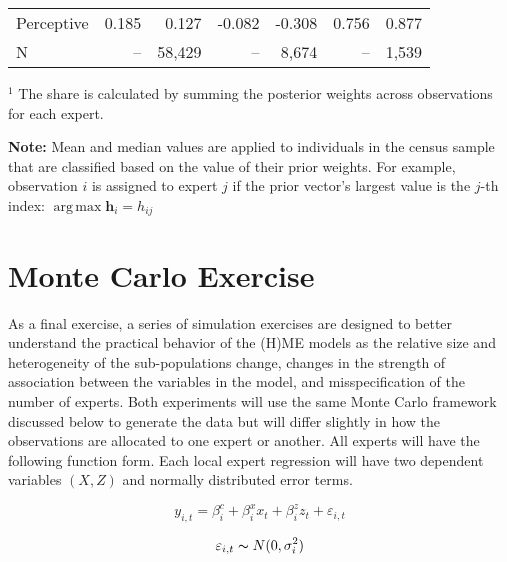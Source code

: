 \documentclass[12pt]{article}
\DeclareMathOperator*{\argmax}{arg\,max}
\theoremstyle{definition}
\begin{document}
\begin{table}
\begin{threeparttable}
\begin{tabular}[l]{l r r r r r r}
      Perceptive            &   0.185 &   0.127 & -0.082 & -0.308 &   0.756 &   0.877 \\
      \cmidrule{1-7}
      N                     &      -- &  58,429 &     -- &  8,674 &      -- &   1,539 \\
      \hline
        \end{tabular}
        \begin{tablenotes}
          \item{\footnotesize $^{1}$ The share is calculated by summing the 
          posterior weights across observations for each expert.}
          \item{\footnotesize \textbf{Note:} Mean and median values are applied to individuals
          in the census sample that are classified based on the value of their prior weights.
          For example, observation $i$ is assigned to expert $j$ if the prior vector's
          largest value is the $j$-th index: $\argmax \boldsymbol{h}_{i} = h_{ij}$}
        \end{tablenotes} \label{tbl:HME3_sample_comparison}
      \end{threeparttable}
    \end{table}
  

\clearpage


\section{Monte Carlo Exercise} \label{sec:MonteCarlo}

As a final exercise, a series of simulation exercises are designed to better understand the practical behavior of the (H)ME models as the relative size and heterogeneity of the sub-populations change, changes in the strength of association between the variables in the model, and misspecification of the number of experts. Both experiments will use the same Monte Carlo framework discussed below to generate the data but will differ slightly in how the observations are allocated to one expert or another. All experts will have the following function form. Each local expert regression will have two dependent variables $(X, Z)$ and normally distributed error terms. 

\begin{equation} \label{eq:MC_regression_eq}
    y_{i,t} = \beta_{i}^{c} + \beta_{i}^{x}  x_{t} + \beta_{i}^{z}  z_{t} + \varepsilon_{i,t}
\end{equation}

\begin{equation} \label{eq:MC_regression_errors}
    \varepsilon_{i,t} \thicksim N(0, \sigma^{2}_{i})
\end{equation}
\end{document}
